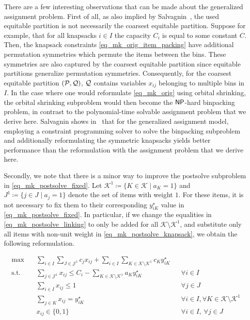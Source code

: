 \documentclass[pdflatex,sn-mathphys-num]{sn-jnl}%
\theoremstyle{thmstyleone}%
\theoremstyle{thmstylethree}%
\theoremstyle{thmstyletwo}%
\begin{document}
There are a few interesting observations that can be made about the generalized assignment problem. First of all, as also implied by Salvagnin~\cite{Salvagnin2013}, the used equitable partition is not necessarily the coarsest equitable partition. Suppose for example, that for all knapsacks $i\in I$ the capacity $C_i$ is equal to some constant $C$. Then, the knapsack constraints \eqref{eq_mk_orig_item_packing} have additional permutation symmetries which permute the items between the bins. These symmetries are also captured by the coarsest equitable partition since equitable partitions generalize permutation symmetries. Consequently, for the coarsest equitable partition $(\mathcal{P},\mathcal{Q})$, $\mathcal{Q}$ contains variables $x_{ij}$ belonging to multiple bins in $I$. In the case where one would reformulate \eqref{eq_mk_orig} using orbital shrinking, the orbital shrinking subproblem would then become the $\mathsf{NP}$-hard binpacking problem, in contrast to the polynomial-time solvable assignment problem that we derive here. Salvagnin shows in~\cite{Salvagnin2013} that for the generalized assignment model, employing a constraint programming solver to solve the binpacking subproblem and additionally reformulating the symmetric knapsacks yields better performance than the reformulation with the assignment problem that we derive here. 

Secondly, we note that there is a minor way to improve the postsolve subproblem in \eqref{eq_mk_postsolve_fixed}. Let $\mathcal{K}^1 \coloneqq \{K\in \mathcal{K} \mid a_{K} = 1\}$ and $J^1 \coloneqq \{ j\in J \mid a_j = 1\}$ denote the set of items with weight $1$. For these items, it is not necessary to fix them to their corresponding $y^\star_{iK}$ value in \eqref{eq_mk_postsolve_fixed}. In particular, if we change the equalities in \eqref{eq_mk_postsolve_linking} to only be added for all $\mathcal{K}\setminus \mathcal{K}^1$, and substitute only all items with non-unit weight in \eqref{eq_mk_postsolve_knapsack}, we obtain the following reformulation.

\begin{subequations}
\label{eq_mk_unit}
\begin{align}
\max\quad & \sum_{i\in I}\sum_{J\in \mathcal{J}^1} c_j x_{ij} + \sum_{i\in I}\sum_{K\in \mathcal{K}\setminus \mathcal{K}^1} c_K y^\star_{iK}  \\
\text{s.t.}\quad 
& \sum_{j\in \mathcal{J}^1} x_{ij} \leq C_i - \sum_{K\in \mathcal{K}\setminus \mathcal{K}^1} a_K y^\star_{iK}
&& \forall i\in I \label{eq_mk_unit_knapsack}\\
& \sum_{i\in I} x_{ij} \leq 1 
&& \forall j\in J \label{eq_mk_unit_usedonce}\\
& \sum_{j\in K} x_{ij} = y^{\star}_{iK} &&\forall i \in I, \forall K\in \mathcal{K}\setminus \mathcal{K}^1 \label{eq_mk_unit_linking}\\
& x_{ij} \in \{0,1\} 
&& \forall i\in I,\ \forall j\in J
\end{align}
\end{subequations}
\end{document}
